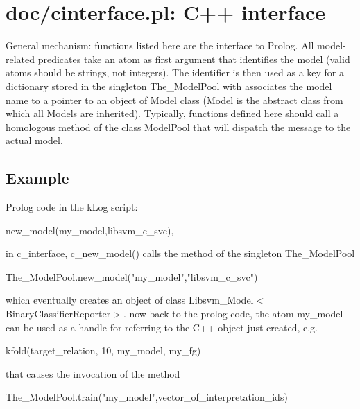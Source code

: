 


\section{doc/cinterface.pl: C++ interface}

\label{sec:cinterface}

General mechanism: functions listed here are the interface to
Prolog. All model-related predicates take an atom as first argument
that identifies the model (valid atoms should be strings, not
integers). The identifier is then used as a key for a dictionary
stored in the singleton The_ModelPool with associates the model
name to a pointer to an object of Model class (Model is the
abstract class from which all Models are inherited). Typically,
functions defined here should call a homologous method of the class
ModelPool that will dispatch the message to the actual model.

\subsection{Example}

Prolog code in the kLog script:

\begin{code}
new_model(my_model,libsvm_c_svc),
\end{code}

in c_interface, c_new_model() calls the method of the singleton The_ModelPool

\begin{code}
The_ModelPool.new_model("my_model","libsvm_c_svc")
\end{code}

which eventually creates an object of class
Libsvm_Model$<$BinaryClassifierReporter$>$. now back to the prolog
code, the atom my_model can be used as a handle for referring to
the C++ object just created, e.g.

\begin{code}
kfold(target_relation, 10, my_model, my_fg)
\end{code}

that causes the invocation of the method

\begin{code}
The_ModelPool.train("my_model",vector_of_interpretation_ids)
\end{code}


